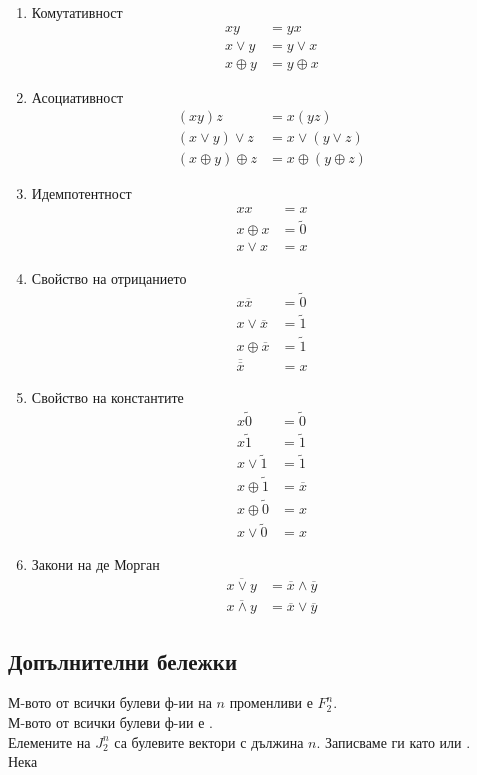 \begin{enumerate}
    \item Комутативност
    \begin{align*}
        xy &= yx \\
        x \vee y &= y \vee x \\
        x \oplus y &= y \oplus x
    \end{align*}
    \item Асоциативност
    \begin{align*}
        (xy)z &= x(yz) \\
        (x \vee y) \vee z &= x \vee (y \vee z) \\
        (x \oplus y) \oplus z &= x \oplus (y \oplus z)
    \end{align*}
    \item Идемпотентност
    \begin{align*}
        xx &= x \\
        x \oplus x &= \tilde{0} \\
        x \vee x &= x
    \end{align*}
    \item Свойство на отрицанието
    \begin{align*}
        x\overline{x} &= \tilde{0} \\
        x \vee \overline{x} &= \tilde{1} \\
        x \oplus \overline{x} &= \tilde{1} \\
        \overline{\overline{x}} &= x
    \end{align*}
    \item Свойство на константите
    \begin{align*}
        x\tilde{0} &= \tilde{0} \\
        x\tilde{1} &= \tilde{1} \\
        x \vee \tilde{1} &= \tilde{1} \\
        x \oplus \tilde{1} &= \overline{x} \\
        x \oplus \tilde{0} &= x \\
        x \vee \tilde{0} &= x
    \end{align*}
    \item Закони на де Морган
    \begin{align*}
        \overline{x \vee y} &= \overline{x} \land \overline{y} \\
        \overline{x \land y} &= \overline{x} \vee \overline{y}
    \end{align*}
\end{enumerate}

\subsection{Допълнителни бележки}
М-вото от всички булеви ф-ии на \(n\) променливи е \(F_2^n\). \\
М-вото от всички булеви ф-ии е . \\
Елемените на \(J_2^n\) са булевите вектори с дължина \(n\). Записваме ги като  
или . \\
Нека  \totw 